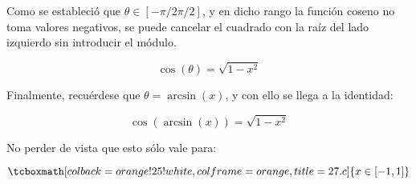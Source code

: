 \documentclass{article}
\newcommand{\hresult}[2]{\tcboxmath[colback=orange!25!white,colframe=orange, title=#1] {#2} }
\begin{document}
Como se estableció que $ \theta \in [ -\pi/2 \pi/2 ] $, y en dicho rango la función coseno no toma valores negativos, se puede cancelar el cuadrado con la raíz del lado izquierdo sin introducir el módulo.

\begin{equation}
\cos( \theta ) = \sqrt{ 1 - x^2 }
\end{equation}

Finalmente, recuérdese que $ \theta = \arcsin(x) $, y con ello se llega a la identidad:

\begin{equation}
\cos( \arcsin(x) ) = \sqrt{ 1 - x^2 }
\end{equation}

No perder de vista que esto sólo vale para:

\begin{equation}
\hresult{27.c}{x \in [-1, 1]}
\end{equation}
\end{document}
